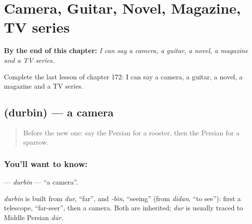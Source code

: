 
\chapter{Camera, Guitar, Novel, Magazine, TV series}
\label{ch:fa-camera-guitar-novel-magazine-tv-series}

\begin{chapteropening}
\textbf{By the end of this chapter:} \emph{I can say a camera, a guitar, a novel, a magazine and a TV series.}

Complete the last lesson of chapter 172: I can say a camera, a guitar, a novel, a magazine and a TV series.
\end{chapteropening}

\section[\texorpdfstring{\fa{دوربین} (durbin)}{دوربین (durbin)}]{ (durbin) — a camera}

\label{lesson:FA-C172-durbin}



\begin{quote}
Before the new one: say the Persian for a rooster, then the Persian for a sparrow.
\end{quote}

\subsection*{You'll want to know: }
\textbf{} — \emph{durbin} — \textquotedblleft{}a camera\textquotedblright{}.

\begin{cousinweb}
\emph{durbin} is built from \emph{dur}, \textquotedblleft{}far\textquotedblright{}, and \emph{-bin}, \textquotedblleft{}seeing\textquotedblright{} (from \emph{didan}, \textquotedblleft{}to see\textquotedblright{}): first a telescope, \textquotedblleft{}far-seer\textquotedblright{}, then a camera. Both are inherited; \emph{dur} is usually traced to Middle Persian \emph{dūr}.
\end{cousinweb}

